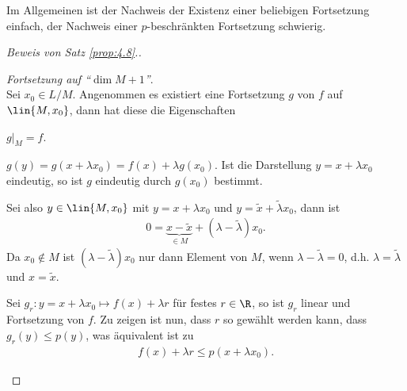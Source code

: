 \begin{bem}
\label{bem:4.9}
Im Allgemeinen ist der Nachweis der Existenz einer beliebigen Fortsetzung
einfach, der Nachweis einer $p$-beschränkten Fortsetzung schwierig.\maphere
\end{bem}

\begin{proof}[Beweis von Satz \ref{prop:4.8}.]
\begin{proofenum}
  \item \textit{Fortsetzung auf ``$\dim M+1$''}.\\ Sei $x_0\in L/M$. Angenommen
  es existiert eine Fortsetzung $g$ von $f$ auf $\lin{M,x_0}$, dann hat diese
  die Eigenschaften
  \begin{defnenum}
    \item $g|_M = f$.
    \item $g(y) = g(x+\lambda x_0) = f(x) + \lambda g(x_0)$. Ist die
    Darstellung $y=x+\lambda x_0$ eindeutig, so ist $g$ eindeutig durch $g(x_0)$
    bestimmt.
    
    Sei also $y\in \lin{M,x_0}$ mit $y=x+\lambda x_0$ und
    $y=\tilde{x}+\tilde{\lambda}x_0$, dann ist
\begin{align*}
0 = \underbrace{x-\tilde{x}}_{\in M} + (\lambda-\tilde{\lambda})x_0.
\end{align*}
Da $x_0\notin M$ ist $(\lambda-\tilde{\lambda})x_0$ nur dann Element von $M$,
wenn $\lambda-\tilde{\lambda}=0$, d.h. $\lambda=\tilde{\lambda}$ und
$x=\tilde{x}$.
\end{defnenum}
Sei $g_r : y = x+\lambda x_0 \mapsto f(x) + \lambda r$ für festes $r\in\R$, so
ist $g_r$ linear und Fortsetzung von $f$. Zu zeigen ist nun, dass $r$ so gewählt
werden kann, dass $g_r(y)\le p(y)$, was äquivalent ist zu
\begin{align*}
f(x)+\lambda r \le p(x+\lambda x_0).\tag{*}
\end{align*}
  

\end{proofenum}
\end{proof}
